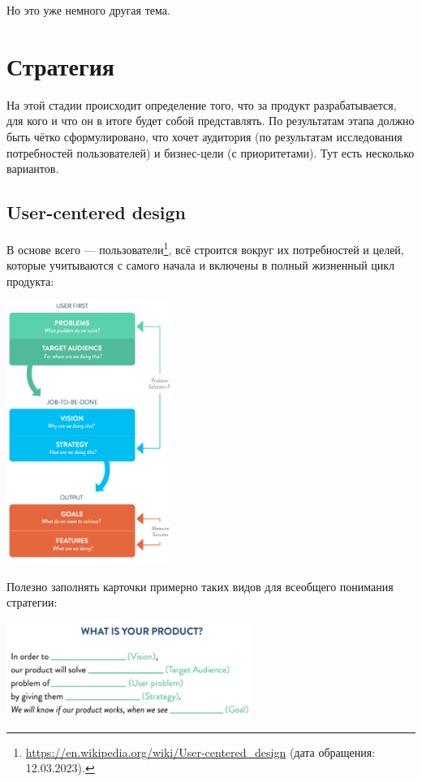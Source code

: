 \documentclass{../../text-style}
\begin{document}
Но это уже немного другая тема.

\section{Стратегия}

На этой стадии происходит определение того, что за продукт разрабатывается, для кого и что он в итоге будет собой представлять. По результатам этапа должно быть чётко сформулировано, что хочет аудитория (по результатам исследования потребностей пользователей) и бизнес-цели (с приоритетами).
Тут есть несколько вариантов.

\subsection{User-centered design}

В основе всего --- пользователи\footnote{\url{https://en.wikipedia.org/wiki/User-centered_design} (дата обращения: 12.03.2023).}, всё строится вокруг их потребностей и целей, которые учитываются с самого начала и включены в полный жизненный цикл продукта:

\begin{center}
    \includegraphics[width=0.4\textwidth]{userCenteredDesignProcess.png}
\end{center}

Полезно заполнять карточки примерно таких видов для всеобщего понимания стратегии:

\begin{center}
    \includegraphics[width=0.6\textwidth]{productCard.png}
\end{center}
\end{document}
